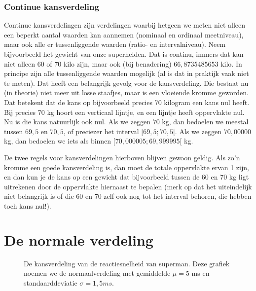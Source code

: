 {\subsubsection{Continue kansverdeling}

Continue kansverdelingen zijn verdelingen waarbij hetgeen we meten niet alleen een beperkt aantal waarden kan aannemen (nominaal en ordinaal meetniveau), maar ook alle er tussenliggende waarden (ratio- en intervalniveau). Neem bijvoorbeeld het gewicht van onze superhelden. Dat is continu, immers dat kan niet alleen $60$ of $70$ kilo zijn, maar ook (bij benadering)  $66,8735485653$ kilo. In principe zijn alle tussenliggende waarden mogelijk (al is dat in praktijk vaak niet te meten). Dat heeft een belangrijk gevolg voor de kansverdeling. Die bestaat nu (in theorie) niet meer uit losse staafjes, maar is een vloeiende kromme geworden. Dat betekent dat de kans op bijvoorbeeld precies $70$ kilogram een kans nul heeft. Bij precies $70$ kg hoort een verticaal lijntje, en een lijntje heeft oppervlakte nul. Nu is die kans natuurlijk ook nul. Als we zeggen $70$ kg, dan bedoelen we meestal tussen $69,5$ en $70,5$, of preciezer het interval $[69,5; 70,5[$. Als we zeggen $70,00000$ kg, dan bedoelen we iets als binnen $[70,000005; 69,999995[$ kg.

De twee regels voor kansverdelingen hierboven blijven gewoon geldig. Als zo'n kromme een goede kansverdeling is, dan moet de totale oppervlakte ervan 1 zijn, en dan kun je de kans op een gewicht dat bijvoorbeeld tussen de 60 en 70 kg ligt uitrekenen door de oppervlakte hiernaast te bepalen (merk op dat het uiteindelijk niet belangrijk is of die $60$ en $70$ zelf ook nog tot het interval behoren, die hebben toch kans nul!).

\section{De normale verdeling}

\begin{figure}[t]
\centering
{}
\caption{De kansverdeling van de reactiesnelheid van superman. Deze grafiek noemen we de normaalverdeling met gemiddelde $\mu = 5$ ms en standaarddeviatie $\sigma = 1,5 ms.$}
\label{fig:verdelingReactievermogen}
\end{figure}


}
